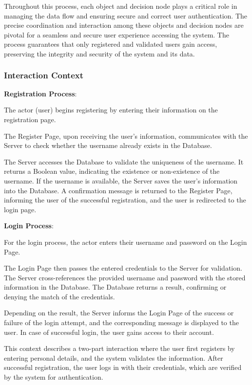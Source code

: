 \documentclass[conference]{IEEEtran}
\begin{document}
Throughout this process, each object and decision node plays a critical role in managing the data flow and ensuring secure and correct user authentication. The precise coordination and interaction among these objects and decision nodes are pivotal for a seamless and secure user experience accessing the system. The process guarantees that only registered and validated users gain access, preserving the integrity and security of the system and its data.

\subsubsection{\textbf{Interaction Context}}
\textbf{}

\textbf{Registration Process}:

The actor (user) begins registering by entering their information on the registration page.

The Register Page, upon receiving the user's information, communicates with the Server to check whether the username already exists in the Database.

The Server accesses the Database to validate the uniqueness of the username. It returns a Boolean value, indicating the existence or non-existence of the username.
If the username is available, the Server saves the user's information into the Database. A confirmation message is returned to the Register Page, informing the user of the successful registration, and the user is redirected to the login page.

\textbf{Login Process}:

For the login process, the actor enters their username and password on the Login Page.

The Login Page then passes the entered credentials to the Server for validation.
The Server cross-references the provided username and password with the stored information in the Database. The Database returns a result, confirming or denying the match of the credentials.

Depending on the result, the Server informs the Login Page of the success or failure of the login attempt, and the corresponding message is displayed to the user. In case of successful login, the user gains access to their account.

This context describes a two-part interaction where the user first registers by entering personal details, and the system validates the information. After successful registration, the user logs in with their credentials, which are verified by the system for authentication.
\end{document}
